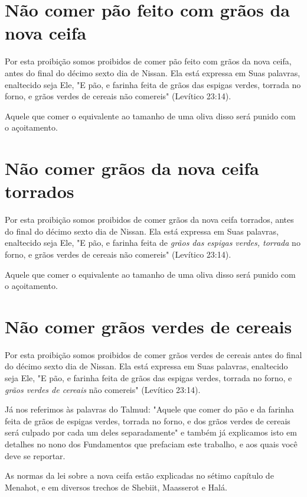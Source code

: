 \begin{itemize}
\begin{enumrate}
\begin{itemize}
\begin{itemize}
\begin{itemize}
\begin{enumerate}
\end{enumerate}

\section{Não comer pão feito com grãos da nova ceifa}

Por esta proibição somos proibidos de comer pão feito com grãos da nova
ceifa, antes do final do décimo sexto dia de Nissan. Ela está expressa
em Suas palavras, enaltecido seja Ele, "E pão, e farinha feita de grãos
das espigas verdes, torrada no forno, e grãos verdes de cereais não
comereis" (Le­vítico 23:14).

Aquele que comer o equivalente ao tamanho de uma oliva disso será punido
com o açoitamento.

\section{Não comer grãos da nova ceifa torrados}

Por esta proibição somos proibidos de comer grãos da nova ceifa
tor­rados, antes do final do décimo sexto dia de Nissan. Ela está
expressa em Suas palavras, enaltecido seja Ele, "E pão, e farinha feita
de \emph{grãos das espigas verdes, torrada} no forno, e grãos verdes de
cereais não comereis" (Levítico 23:14).

Aquele que comer o equivalente ao tamanho de uma oliva disso será punido
com o açoitamento.

\section{Não comer grãos verdes de cereais}

Por esta proibição somos proibidos de comer grãos verdes de ce­reais
antes do final do décimo sexto dia de Nissan. Ela está expressa em Suas
palavras, enaltecido seja Ele, "E pão, e farinha feita de grãos das
espigas verdes, torrada no forno, e \emph{grãos verdes de cereais} não
comereis" (Levítico 23:14).

Já nos referimos às palavras do Talmud: "Aquele que comer do pão e da
farinha feita de grãos de espigas verdes, torrada no forno, e dos grãos
ver­des de cereais será culpado por cada um deles separadamente" e
também já explicamos isto em detalhes no nono dos Fundamentos que
prefaciam este tra­balho, e aos quais você deve se reportar.

As normas da lei sobre a nova ceifa estão explicadas no sétimo capí­tulo
de Menahot, e em diversos trechos de Shebiit, Maasserot e Halá.


\end{itemize}
\end{itemize}
\end{itemize}
\end{enumrate}
\end{itemize}
